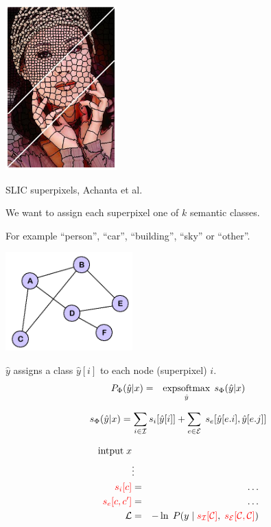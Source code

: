 {
\centerline{\includegraphics[height = 2.5in]{../images/SLICcolor}}
\centerline{\huge SLIC superpixels, Achanta et al.}

\vfill
We want to assign each superpixel one of $k$ semantic classes.

\vfill
For example ``person'', ``car'', ``building'', ``sky'' or ``other''.

\bigskip
\centerline{\includegraphics[height= 1.5in]{../images/Graph}}
\medskip
$\hat{y} $ assigns a class $\hat{y}[i]$ to each node (superpixel) $i$.
\bigskip
\bigskip
{\color{red}
\begin{eqnarray*}
P_\Phi(\hat{y}|x) & = & \operatorname*{expsoftmax}_{\hat{y}}\;s_\Phi(\hat{y}|x)
\end{eqnarray*}
}

\vfill
{\color{red} $$s_\Phi(\hat{y}|x) = \sum_{i \in {\cal I}} s_i[\hat{y}[i]] + \sum_{e \in {\cal E}}\;s_e[\hat{y}[e.i],\hat{y}[e.j]]$$}


\vfill
\begin{eqnarray*}
\mbox{intput}\; x \\
 & \vdots & \\
{\color{red} s_i[c]} & = & \ldots \\
{\color{red} s_e[c,c']} & = & \ldots \\
{\cal L} & = & - \ln\; P(y\;|\;{\color{red} s_{\cal I}[{\cal C}]},\;{\color{red} s_{\cal E}[{\cal C}, {\cal C}]})
\end{eqnarray*}

}
